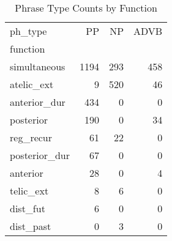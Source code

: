 \begin{table}[htbp!]
\centering
\caption{Phrase Type Counts by Function}
\label{table:funcpt_ct}
\begin{tabular}{lrrr}
\toprule
ph\_type &    PP &   NP &  ADVB \\
function      &       &      &       \\
\midrule
simultaneous  &  1194 &  293 &   458 \\
atelic\_ext    &     9 &  520 &    46 \\
anterior\_dur  &   434 &    0 &     0 \\
posterior     &   190 &    0 &    34 \\
reg\_recur     &    61 &   22 &     0 \\
posterior\_dur &    67 &    0 &     0 \\
anterior      &    28 &    0 &     4 \\
telic\_ext     &     8 &    6 &     0 \\
dist\_fut      &     6 &    0 &     0 \\
dist\_past     &     0 &    3 &     0 \\
\bottomrule
\end{tabular}
\end{table}
